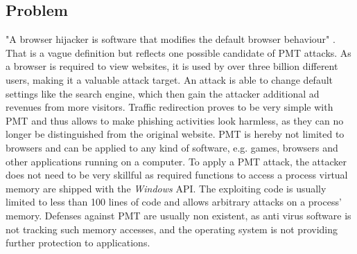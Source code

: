 \subsection{Problem}
"A browser hijacker is software that modifies the default browser behaviour" \cite{automatedspywarecollection}. That is a  vague definition but reflects one possible candidate of \gls{PMT} attacks. As a browser is required to view websites, it is used by over three billion \cite{cia} different users, making it a valuable attack target. An attack is able to change default settings like the search engine, which then gain the attacker additional ad revenues from more visitors. Traffic redirection proves to be very simple with \gls{PMT} and thus allows to make phishing activities look harmless, as they can no longer be distinguished from the original website. \gls{PMT} is hereby not limited to browsers and can be applied to any kind of software, e.g. games, browsers and other applications running on a computer. To apply a \gls{PMT} attack, the attacker does not need to be very skillful as required functions to access a process virtual memory are shipped with the \emph{Windows} \gls{API}. The exploiting code is usually limited to less than 100 lines of code and allows arbitrary attacks on a process' memory. Defenses against \gls{PMT} are usually non existent, as anti virus software is not tracking such memory accesses, and the operating system is not providing further protection to applications.